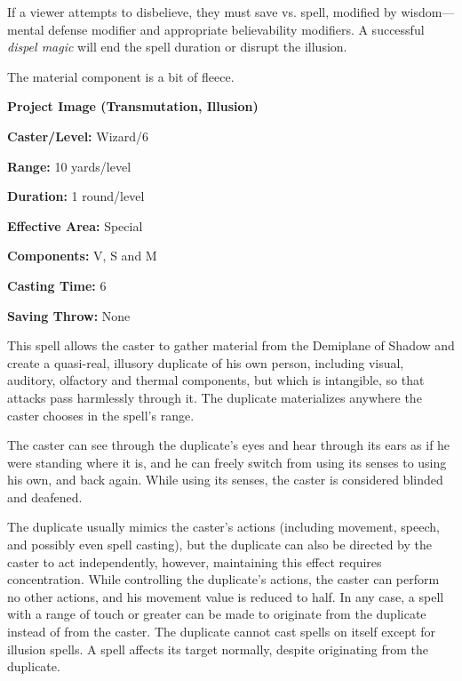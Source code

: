 \begin{multicols}{2}
If a viewer attempts to disbelieve, they must save vs. spell, modified by wisdom---mental defense modifier and appropriate believability modifiers.  A successful \textit{dispel magic} will end the spell duration or disrupt the illusion.

The material component is a bit of fleece.

\vspace{1em}

\noindent
\begin{minipage}{\columnwidth}

\noindent \textbf{Project Image (Transmutation, Illusion)}

\noindent \textbf{Caster/Level:} Wizard/6

\noindent \textbf{Range:} 10 yards/level

\noindent \textbf{Duration:} 1 round/level

\noindent \textbf{Effective Area:} Special

\noindent \textbf{Components:} V, S and M

\noindent \textbf{Casting Time:} 6

\noindent \textbf{Saving Throw:} None

\end{minipage}

This spell allows the caster to gather material from the Demiplane of Shadow and create a quasi-real, illusory duplicate of his own person, including visual, auditory, olfactory and thermal components, but which is intangible, so that attacks pass harmlessly through it.  The duplicate materializes anywhere the caster chooses in the spell's range.

The caster can see through the duplicate's eyes and hear through its ears as if he were standing where it is, and he can freely switch from using its senses to using his own, and back again.  While using its senses, the caster is considered blinded and deafened. 

The duplicate usually mimics the caster's actions (including movement, speech, and possibly even spell casting), but the duplicate can also be directed by the caster to act independently, however, maintaining this effect requires concentration.  While controlling the duplicate's actions, the caster can perform no other actions, and his movement value is reduced to half.  In any case, a spell with a range of touch or greater can be made to originate from the duplicate instead of from the caster.  The duplicate cannot cast spells on itself except for illusion spells.  A spell affects its target normally, despite originating from the duplicate. 


\end{multicols}
